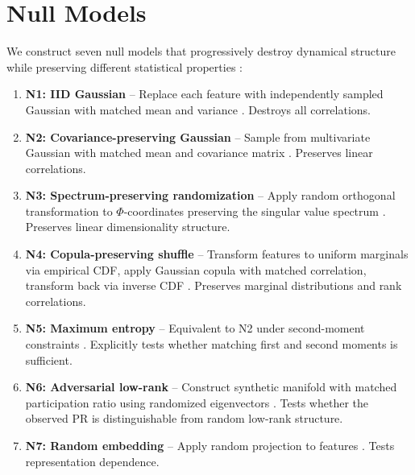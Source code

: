 \documentclass[aip,chaos,showpacs,superscriptaddress,groupedaddress]{revtex4-1}
\begin{document}
\section{Null Models}
\label{sec:null_models}

We construct seven null models that progressively destroy dynamical structure while preserving different statistical properties \cite{cover1991elements}:

\begin{enumerate}
\item \textbf{N1: IID Gaussian} -- Replace each feature with independently sampled Gaussian with matched mean and variance \cite{donoho2000intrinsic}. Destroys all correlations.

\item \textbf{N2: Covariance-preserving Gaussian} -- Sample from multivariate Gaussian with matched mean and covariance matrix \cite{amari1982differential}. Preserves linear correlations.

\item \textbf{N3: Spectrum-preserving randomization} -- Apply random orthogonal transformation to $\Phi$-coordinates preserving the singular value spectrum \cite{albano1988singular}. Preserves linear dimensionality structure.

\item \textbf{N4: Copula-preserving shuffle} -- Transform features to uniform marginals via empirical CDF, apply Gaussian copula with matched correlation, transform back via inverse CDF \cite{villani2009optimal}. Preserves marginal distributions and rank correlations.

\item \textbf{N5: Maximum entropy} -- Equivalent to N2 under second-moment constraints \cite{cover1991elements}. Explicitly tests whether matching first and second moments is sufficient.

\item \textbf{N6: Adversarial low-rank} -- Construct synthetic manifold with matched participation ratio using randomized eigenvectors \cite{costa2007intrinsic}. Tests whether the observed PR is distinguishable from random low-rank structure.

\item \textbf{N7: Random embedding} -- Apply random projection to features \cite{verleysen2005curse}. Tests representation dependence.
\end{enumerate}
\end{document}

